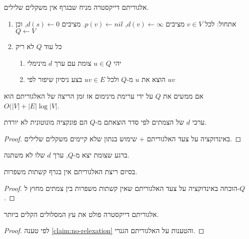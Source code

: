 אלגוריתם דייקסטרה מניח שבגרף אין משקלים שלילים.

\begin{enumerate}
\item
אתחול: לכל
$v \in V$
מציבים 
$d(v) \leftarrow \infty$, 
$p(v) \leftarrow nil$.
מציבים
$d(s) \leftarrow 0$, 
וכן 
$Q \leftarrow V$
\item
כל עוד $Q$ לא ריק
\begin{enumerate}
\item
יהי 
$u \in Q$
צומת עם ערך $d$ מינימלי
\item
הוצא את $u$ מ-$Q$ ולכל 
$uv \in E$
בצע ניסיון שיפור לפי
$uv$
\end{enumerate}
\end{enumerate}

אם ממשים את $Q$ על ידי ערימת מינימום אז זמן הריצה של האלגוריתם הוא 
$O(|V| + |E|\log|V|$.

\begin{claim}
ערכי $d$ של הצמתים לפי סדר הוצאתם מ-$Q$ הם פונקציה מונוטונית לא יורדת.
\end{claim}

\begin{proof}
באינדוקציה על צעד האלגוריתם + שימוש בנתון שלא קיימים משקלים שלילים.
\end{proof}

\begin{corollary}
ברגע שצומת יצא מ-$Q$, ערך $d$ שלו לא משתנה.
\end{corollary}

\begin{claim}
\label{claim:no-relexation}
בסיום ריצת האלגוריתם אין בגרף קשתות משפרות.
\end{claim}
\begin{proof}
הוכחה באינדוקציה על צעד האלגוריתם שאין קשתות משפרות בין צמתים מחוץ ל-$Q$.
\end{proof}

\begin{theorem}
אלגוריתם דייקסטרה פולט את עץ המסלולים הקלים ביותר.
\end{theorem}
\begin{proof}
לפי טענה
\ref{claim:no-relexation}
והטענות על האלגוריתם הגנרי.
\end{proof}




